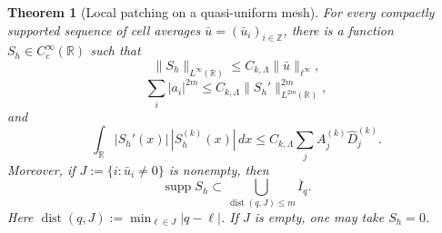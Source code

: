 \documentclass[11pt]{amsart}
\theoremstyle{plain}
\newtheorem{theorem}{Theorem}[section]
\theoremstyle{definition}
\theoremstyle{remark}
\numberwithin{equation}{section}
\theoremstyle{plain}
\begin{document}
\begin{theorem}[Local patching on a quasi-uniform mesh]
	\label{thm:quasi-local-patching}
	For every compactly supported sequence of cell averages
	$\bar u=(\bar u_i)_{i\in\mathbb Z}$, there is a function
	$S_h\in C_c^\infty(\mathbb R)$ such that
	\begin{equation}\label{eq:patching-linfty}
		\|S_h\|_{L^\infty(\mathbb R)}
		\le C_{k,\Lambda}\|\bar u\|_{\ell^\infty},
	\end{equation}
	\begin{equation}\label{eq:patching-first-derivative}
		\sum_i|a_i|^{2m}
		\le C_{k,\Lambda}
		\|S_h'\|_{L^{2m}(\mathbb R)}^{2m},
	\end{equation}
	and
	\begin{equation}\label{eq:patching-high-derivative}
		\int_{\mathbb R}|S_h'(x)|\,|S_h^{(k)}(x)|\,dx
		\le C_{k,\Lambda}
		\sum_j A_j^{(k)}\widehat D_j^{(k)}.
	\end{equation}
	Moreover, if $J:=\{i:\bar u_i\ne0\}$ is nonempty, then
	\begin{equation}\label{eq:patching-support}
		\operatorname{supp}S_h
		\subset
		\bigcup_{\operatorname{dist}(q,J)\le m}\overline I_q.
	\end{equation}
	Here
	$\operatorname{dist}(q,J):=\min_{\ell\in J}|q-\ell|$.
	If $J$ is empty, one may take $S_h=0$.
\end{theorem}
\end{document}
